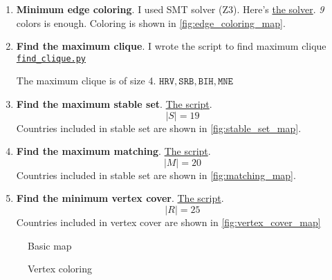 \documentclass[12pt, a4paper]{article}
\begin{document}
\begin{enumerate}[label=\alph*)]
\item \textbf{Minimum edge coloring}. I used SMT solver (Z3). Here's
\href{https://github.com/ablearthy-itmo-39828cf299f04949c86/discrete-math-2-hw-1/blob/8bc76f0/auto/edge_coloring.py}{the
solver}.
\textit{9} colors is enough. Coloring is shown in \cref{fig:edge_coloring_map}.

\item \textbf{Find the maximum clique}. I wrote the script to find maximum
clique
\href{https://github.com/ablearthy-itmo-39828cf299f04949c86/discrete-math-2-hw-1/blob/1c391015b3b3a8822ac5e7c6f949004ca919e267/auto/find_clique.py}{\texttt{find\_clique.py}}

The maximum clique is of size 4.
\(\texttt{HRV}, \texttt{SRB}, \texttt{BIH}, \texttt{MNE}\)

\item \textbf{Find the maximum stable set}. \href{https://github.com/ablearthy-itmo-39828cf299f04949c86/discrete-math-2-hw-1/blob/79a6584/auto/stable_set.py}{The script}.
\[|S| = 19\]
Countries included in stable set are shown in \cref{fig:stable_set_map}.

\item \textbf{Find the maximum matching}.
\href{https://github.com/ablearthy-itmo-39828cf299f04949c86/discrete-math-2-hw-1/blob/1fae45a/auto/matching.py}{The
script}.
\[|M| = 20\]
Countries included in stable set are shown in \cref{fig:matching_map}.

\item \textbf{Find the minimum vertex cover}.
\href{https://github.com/ablearthy-itmo-39828cf299f04949c86/discrete-math-2-hw-1/blob/cb98748/auto/vertex_cover.py}{The
script}.
\[|R| = 25\]
Countries included in vertex cover are shown in \cref{fig:vertex_cover_map}




\end{enumerate}



\begin{landscape}
\begin{figure}
\centering

\caption{Basic map}\label{fig:map_basic}
\end{figure}
\end{landscape}

\begin{landscape}
\begin{figure}
\centering

\caption{Vertex coloring}\label{fig:vertex_coloring_map}
\end{figure}
\end{landscape}
\end{document}
